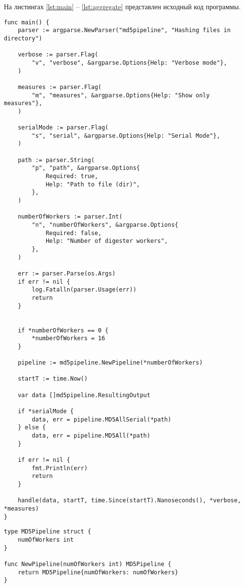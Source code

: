 На листингах \ref{lst:main} -- \ref{lst:aggregate} представлен исходный код программы.
\begin{lstlisting}[label=lst:main,caption={Точка входа в программу}]
func main() {
    parser := argparse.NewParser("md5pipeline", "Hashing files in directory")

    verbose := parser.Flag(
        "v", "verbose", &argparse.Options{Help: "Verbose mode"},
    )

    measures := parser.Flag(
        "m", "measures", &argparse.Options{Help: "Show only measures"},
    )

    serialMode := parser.Flag(
        "s", "serial", &argparse.Options{Help: "Serial Mode"},
    )

    path := parser.String(
        "p", "path", &argparse.Options{
            Required: true,
            Help: "Path to file (dir)",
        },
    )

    numberOfWorkers := parser.Int(
        "n", "numberOfWorkers", &argparse.Options{
            Required: false,
            Help: "Number of digester workers",
        },
    )

    err := parser.Parse(os.Args)
    if err != nil {
        log.Fatalln(parser.Usage(err))
        return
    }


    if *numberOfWorkers == 0 {
        *numberOfWorkers = 16
    }

    pipeline := md5pipeline.NewPipeline(*numberOfWorkers)

    startT := time.Now()

    var data []md5pipeline.ResultingOutput

    if *serialMode {
        data, err = pipeline.MD5AllSerial(*path)
    } else {
        data, err = pipeline.MD5All(*path)
    }

    if err != nil {
        fmt.Println(err)
        return
    }

    handle(data, startT, time.Since(startT).Nanoseconds(), *verbose, *measures)
}
\end{lstlisting}

\begin{lstlisting}[label=lst:pipeline,caption={Определение структуры конвеера}]
type MD5Pipeline struct {
    numOfWorkers int
}

func NewPipeline(numOfWorkers int) MD5Pipeline {
    return MD5Pipeline{numOfWorkers: numOfWorkers}
}
\end{lstlisting}
    

